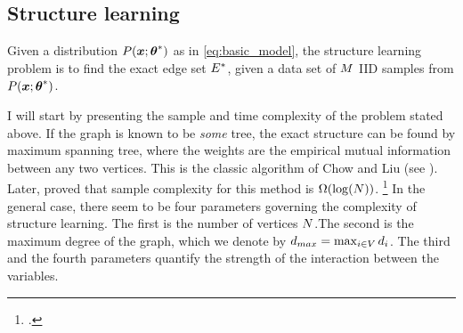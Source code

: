 \subsection{Structure learning}
\label{sec:structure}
Given a distribution $P(\boldsymbol{x};{\boldsymbol{\theta}}^{*})$ as in \eqref{eq:basic_model},
the structure learning problem is to find the exact edge set ${E}^{*}$, given a data set of $M$ IID samples from $P(\boldsymbol{x};{\boldsymbol{\theta}}^{*})$.

I will start by presenting the sample and time complexity of the problem stated above. 
If the graph is known to be {\em some} tree, the exact structure can be found by maximum spanning tree, where the weights are the empirical mutual information between any two vertices. This is the classic algorithm of Chow and Liu (see \cite{chowLiu}). Later, \cite{tan2011large} proved that sample complexity for this method is $\Omega(\log({N}))$.
\footnote{.}
In the general case, there seem to be four parameters governing the complexity of structure learning.
The first is the number of vertices $N$.The second is the maximum degree of the graph, which we denote by $d_{max} = \max_{i \in V} d_i$.
The third and the fourth parameters quantify the strength of the interaction between the variables.

